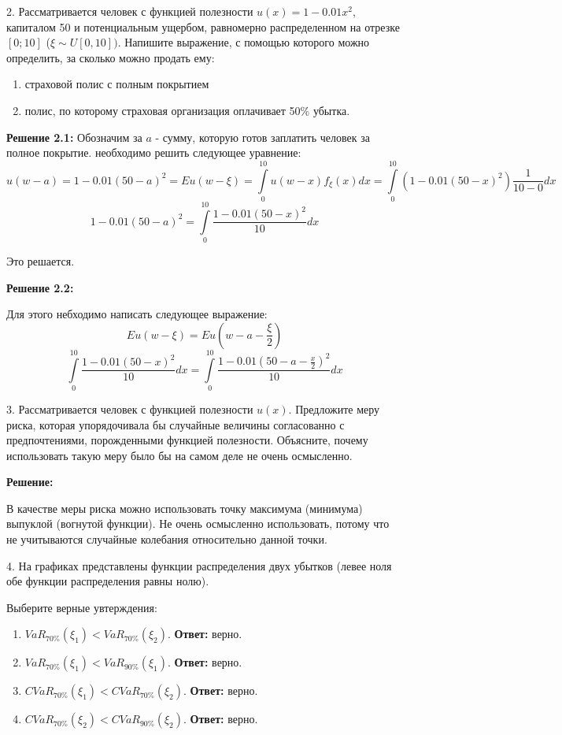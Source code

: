 \documentclass[%
12pt, %
final, %
oneside, %
onecolumn, %
centertags]{article} %
\theoremstyle{plain}
\theoremstyle{definition}
\theoremstyle{remark}
\begin{document}
\newpage

2. Рассматривается человек с функцией полезности $u(x) = 1- 0.01x^2$, капиталом 50 и
потенциальным ущербом, равномерно распределенном на отрезке $[0;10]$ ($\xi \sim U[0,10])$. Напишите
выражение, с помощью которого можно определить, за сколько можно продать ему:
\begin{enumerate}
	\item страховой полис с полным покрытием
	\item полис, по которому страховая организация оплачивает 50\% убытка.
\end{enumerate}

\textbf{Решение 2.1:} Обозначим за $a$ - сумму, которую готов заплатить человек за полное покрытие. необходимо решить следующее уравнение:
$$u(w-a) = 1- 0.01(50-a)^2 = Eu(w-\xi) = \int\limits_0^{10} u(w-x) f_{\xi}(x)dx = \int\limits_0^{10} (1- 0.01(50-x)^2) \frac{1}{10-0} dx$$
$$ 1- 0.01(50-a)^2 = \int\limits_0^{10} \frac{ 1- 0.01(50-x)^2}{10} dx $$

Это решается.

\textbf{Решение 2.2:}

Для этого небходимо написать следующее выражение:
$$Eu(w-\xi) = Eu(w-a - \frac{\xi}{2})$$
$$\int\limits_0^{10} \frac{ 1- 0.01(50-x)^2}{10} dx = \int\limits_0^{10} \frac{1- 0.01(50-a - \frac{x}{2})^2}{10} dx$$
\newpage

3. Рассматривается человек с функцией полезности $u(x)$. Предложите меру риска,
которая упорядочивала бы случайные величины согласованно с предпочтениями,
порожденными функцией полезности. Объясните, почему использовать такую меру было бы на самом деле не очень осмысленно.

\textbf{Решение:}

В качестве меры риска можно использовать точку максимума (минимума) выпуклой (вогнутой функции). Не очень осмысленно использовать, потому что не учитываются случайные колебания относительно данной точки.

\newpage 

4. На графиках представлены функции распределения двух убытков (левее ноля обе
функции распределения равны нолю).

Выберите верные увтерждения:

\begin{enumerate}[label=\alph*.]
\setlength\itemsep{-0.15em}
    \item $VaR_{70\%}(\xi_1)<VaR_{70\%}(\xi_2).$ \textbf{Ответ:} верно.
    \item $VaR_{70\%}(\xi_1)<VaR_{90\%}(\xi_1).$ \textbf{Ответ:} верно.
    \item $CVaR_{70\%}(\xi_1)<CVaR_{70\%}(\xi_2).$ \textbf{Ответ:} верно.
    \item $CVaR_{70\%}(\xi_2)<CVaR_{90\%}(\xi_2).$ \textbf{Ответ:} верно.
\end{enumerate}
\end{document}
